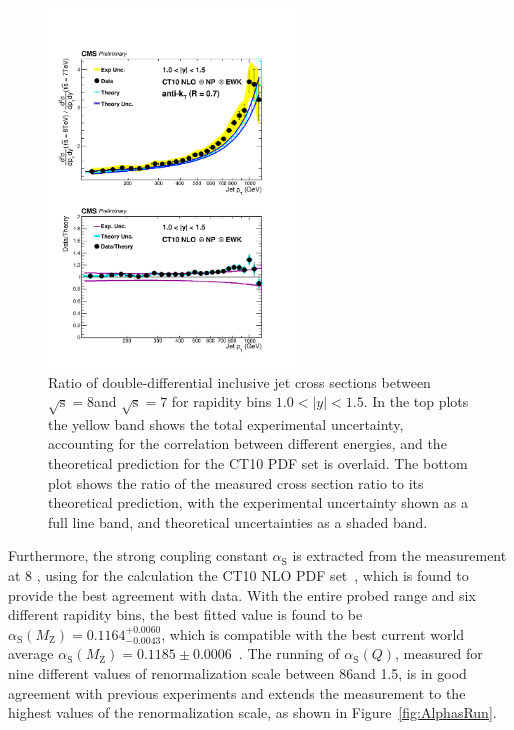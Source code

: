 \documentclass{PoS}
\def\as{\ensuremath{\alpha_\mathrm{S}}\xspace}
\def\asq{\ensuremath{\alpha_\mathrm{S}(Q)}\xspace}
\providecommand{\alpsmz}{\ensuremath{\alpha_\mathrm{S}(M_\mathrm{Z})}\xspace}
\begin{document}
\begin{figure}[hbpt]
  \centering
  \includegraphics[width=0.6\textwidth]{Figure3.pdf}
  \caption{Ratio of double-differential inclusive jet cross sections
    between $\mathrm{\sqrt{s}=8}$\TeV and $\mathrm{\sqrt{s}=7}$\TeV
    for rapidity bins $1.0 < |y| < 1.5$. In the top plots the yellow band shows the total
    experimental uncertainty, accounting for the correlation between
    different energies, and the theoretical prediction for the CT10
    PDF set is overlaid. The bottom plot shows the ratio of the measured
    cross section ratio to its theoretical prediction, with the
    experimental uncertainty shown as a full line band, and
    theoretical uncertainties as a shaded band.}
  \label{fig:ratio8to7}
\end{figure}

Furthermore, the strong coupling constant \as is extracted from the measurement at 8 \TeV, using for the calculation the CT10 NLO PDF
set~\cite{Lai:2010vv}, which is found to provide the best agreement with data.
With the entire probed \pt range and six different rapidity bins, the best fitted value is found to be $\alpsmz =
0.1164^{+0.0060}_{-0.0043}$, which is compatible with the best current world average $\alpsmz =
0.1185\pm0.0006$~\cite{Agashe:2014kda}. The running of \asq, measured for nine different values of renormalization scale 
between 86\GeV and 1.5\TeV, is in good agreement with previous experiments and extends the measurement to the highest
values of the renormalization scale, as shown in Figure~\ref{fig:AlphasRun}.
\end{document}

